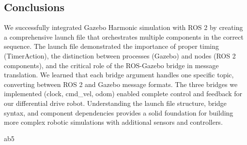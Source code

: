 \subsection{Conclusions}
We successfully integrated Gazebo Harmonic simulation with ROS 2 by creating a comprehensive launch file that orchestrates multiple components in the correct sequence. The launch file demonstrated the importance of proper timing (TimerAction), the distinction between processes (Gazebo) and nodes (ROS 2 components), and the critical role of the ROS-Gazebo bridge in message translation. We learned that each bridge argument handles one specific topic, converting between ROS 2 and Gazebo message formats. The three bridges we implemented (clock, cmd\_vel, odom) enabled complete control and feedback for our differential drive robot. Understanding the launch file structure, bridge syntax, and component dependencies provides a solid foundation for building more complex robotic simulations with additional sensors and controllers.

ab5